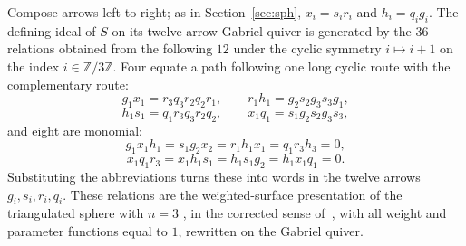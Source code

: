 \documentclass[11pt]{amsart}
\theoremstyle{plain}
\theoremstyle{definition}
\newcommand{\ZZ}{\mathbb{Z}}
\begin{document}
Compose arrows left to right; as in Section~\ref{sec:sph}, $x_i=s_ir_i$ and $h_i=q_ig_i$. The defining ideal
of $S$ on its twelve-arrow Gabriel quiver is generated by the $36$ relations obtained from the following $12$
under the cyclic symmetry $i\mapsto i+1$ on the index $i\in\ZZ/3\ZZ$. Four equate a path following one long
cyclic route with the complementary route:
\[
  g_1x_1 = r_3q_3r_2q_2r_1,\qquad r_1h_1 = g_2s_2g_3s_3g_1,
\]
\[
  h_1s_1 = q_1r_3q_3r_2q_2,\qquad x_1q_1 = s_1g_2s_2g_3s_3,
\]
and eight are monomial:
\[
  g_1x_1h_1 = s_1g_2x_2 = r_1h_1x_1 = q_1r_3h_3 = 0,
\]
\[
  x_1q_1r_3 = x_1h_1s_1 = h_1s_1g_2 = h_1x_1q_1 = 0 .
\]
Substituting the abbreviations turns these into words in the twelve arrows $g_i,s_i,r_i,q_i$. These relations
are the weighted-surface presentation of the triangulated sphere with $n=3$ \cite[\S\S3.1 and~3.4]{Erdmann},
in the corrected sense of~\cite{ErdmannSkowronskiCorr}, with all weight and parameter functions equal to $1$,
rewritten on the Gabriel quiver.



\end{document}

